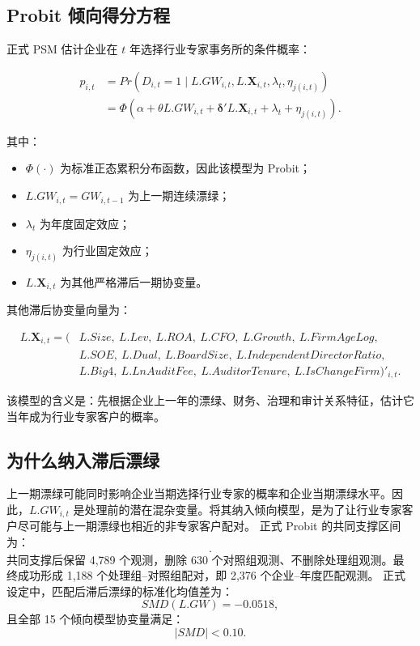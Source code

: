 \documentclass[12pt,a4paper]{article}
\begin{document}
\subsection{Probit 倾向得分方程}

正式 PSM 估计企业在 $t$ 年选择行业专家事务所的条件概率：

\begin{equation}
\begin{aligned}
    p_{i,t}
    &=Pr\left(D_{i,t}=1\mid L.GW_{i,t},L.\mathbf{X}_{i,t},\lambda_t,\eta_{j(i,t)}\right)\\
    &=\Phi\left(
    \alpha+
    \theta L.GW_{i,t}+
    \boldsymbol{\delta}'L.\mathbf{X}_{i,t}+
    \lambda_t+
    \eta_{j(i,t)}
    \right).
\end{aligned}
\end{equation}

其中：

\begin{itemize}
    \item $\Phi(\cdot)$ 为标准正态累积分布函数，因此该模型为 Probit；
    \item $L.GW_{i,t}=GW_{i,t-1}$ 为上一期连续漂绿；
    \item $\lambda_t$ 为年度固定效应；
    \item $\eta_{j(i,t)}$ 为行业固定效应；
    \item $L.\mathbf{X}_{i,t}$ 为其他严格滞后一期协变量。
\end{itemize}

其他滞后协变量向量为：

\begin{equation}
\begin{aligned}
L.\mathbf{X}_{i,t}=\big(&L.Size,\ L.Lev,\ L.ROA,\ L.CFO,\ L.Growth,\ L.FirmAgeLog,\\
&L.SOE,\ L.Dual,\ L.BoardSize,\ L.IndependentDirectorRatio,\\
&L.Big4,\ L.LnAuditFee,\ L.AuditorTenure,\ L.IsChangeFirm\big)'_{i,t}.
\end{aligned}
\end{equation}

该模型的含义是：先根据企业上一年的漂绿、财务、治理和审计关系特征，估计它当年成为行业专家客户的概率。

\subsection{为什么纳入滞后漂绿}
上一期漂绿可能同时影响企业当期选择行业专家的概率和企业当期漂绿水平。因此，$L.GW_{i,t}$ 是处理前的潜在混杂变量。将其纳入倾向模型，是为了让行业专家客户尽可能与上一期漂绿也相近的非专家客户配对。
正式 Probit 的共同支撑区间为：
\begin{equation}
    [0.0236,\ 0.8578].
\end{equation}
共同支撑后保留 4,789 个观测，删除 630 个对照组观测、不删除处理组观测。最终成功形成 1,188 个处理组--对照组配对，即 2,376 个企业--年度匹配观测。
正式设定中，匹配后滞后漂绿的标准化均值差为：
\begin{equation}
    SMD(L.GW)=-0.0518,
\end{equation}
且全部 15 个倾向模型协变量满足：
\begin{equation}
    |SMD|<0.10.
\end{equation}
\end{document}
